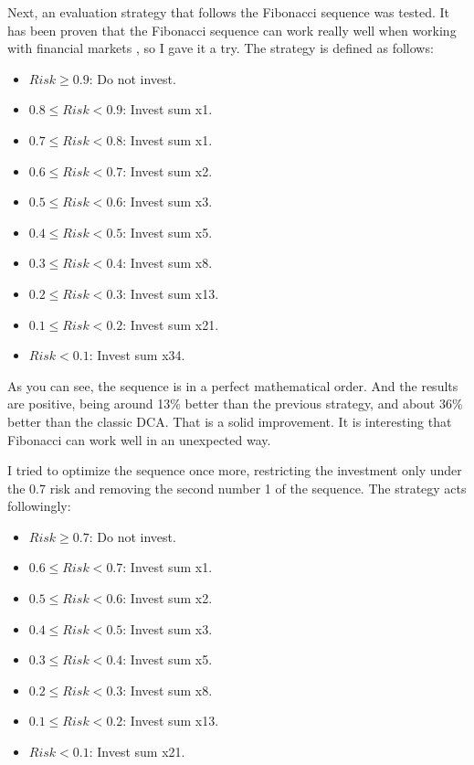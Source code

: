 Next, an evaluation strategy that follows the Fibonacci sequence was tested. It has been proven that the Fibonacci sequence can work really well when working with financial markets \cite{investopedia:fibonacci}, so I gave it a try. The strategy is defined as follows:
\begin{itemize}
    \item $Risk \ge  0.9$: Do not invest.
    \item $0.8 \le Risk < 0.9$: Invest sum x1.
    \item $0.7 \le Risk < 0.8$: Invest sum x1.
    \item $0.6 \le Risk < 0.7$: Invest sum x2.
    \item $0.5 \le Risk < 0.6$: Invest sum x3.
    \item $0.4 \le Risk < 0.5$: Invest sum x5.
    \item $0.3 \le Risk < 0.4$: Invest sum x8.
    \item $0.2 \le Risk < 0.3$: Invest sum x13.
    \item $0.1 \le Risk < 0.2$: Invest sum x21.
    \item $Risk < 0.1$: Invest sum x34.
\end{itemize}

As you can see, the sequence is in a perfect mathematical order. And the results are positive, being around 13\% better than the previous strategy, and about 36\% better than the classic DCA. That is a solid improvement. It is interesting that Fibonacci can work well in an unexpected way.

I tried to optimize the sequence once more, restricting the investment only under the 0.7 risk and removing the second number 1 of the sequence. The strategy acts followingly:
\begin{itemize}
    \item $Risk \ge  0.7$: Do not invest.
    \item $0.6 \le Risk < 0.7$: Invest sum x1.
    \item $0.5 \le Risk < 0.6$: Invest sum x2.
    \item $0.4 \le Risk < 0.5$: Invest sum x3.
    \item $0.3 \le Risk < 0.4$: Invest sum x5.
    \item $0.2 \le Risk < 0.3$: Invest sum x8.
    \item $0.1 \le Risk < 0.2$: Invest sum x13.
    \item $Risk < 0.1$: Invest sum x21.
\end{itemize}

